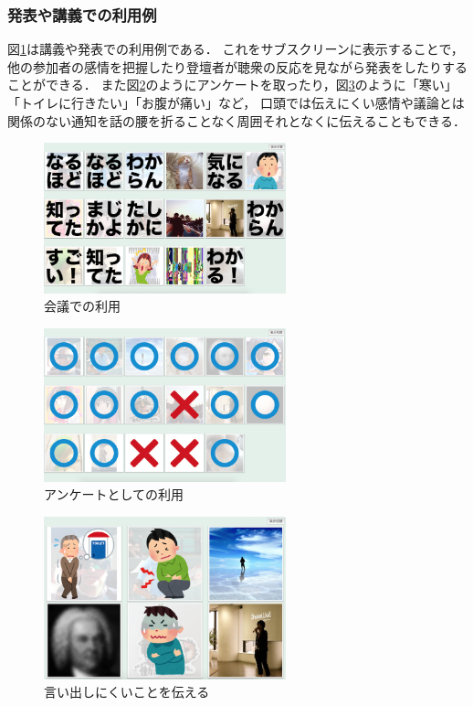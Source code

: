 \subsubsection{発表や講義での利用例}

図\ref{discussion}は講義や発表での利用例である．
これをサブスクリーンに表示することで，他の参加者の感情を把握したり登壇者が聴衆の反応を見ながら発表をしたりすることができる．
また図\ref{vote}のようにアンケートを取ったり，図\ref{rescue}のように「寒い」「トイレに行きたい」「お腹が痛い」など，
口頭では伝えにくい感情や議論とは関係のない通知を話の腰を折ることなく周囲それとなくに伝えることもできる．

\begin{figure}[h]
\centering
\includegraphics[width=7cm]{images/discussion.png}
\caption{会議での利用}
\label{discussion}
\end{figure}

\begin{figure}[h]
\centering
\includegraphics[width=7cm]{images/vote.png}
\caption{アンケートとしての利用}
\label{vote}
\end{figure}

\begin{figure}[h]
\centering
\includegraphics[width=7cm]{images/rescue.png}
\caption{言い出しにくいことを伝える}
\label{rescue}
\end{figure}

